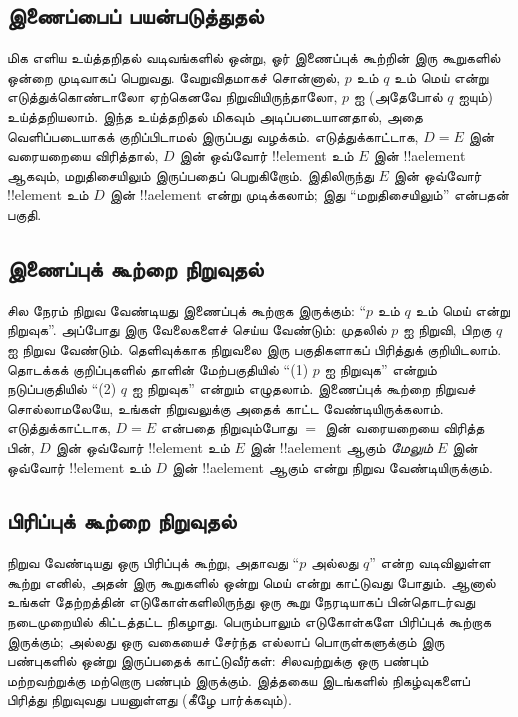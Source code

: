 \documentclass[../../../include/open-logic-section]{subfiles}
\begin{document}
\subsection{இணைப்பைப் பயன்படுத்துதல்}

மிக எளிய உய்த்தறிதல் வடிவங்களில் ஒன்று, ஓர் இணைப்புக்
கூற்றின் இரு கூறுகளில் ஒன்றை முடிவாகப் பெறுவது. வேறுவிதமாகச்
சொன்னால், $p$ உம் $q$ உம் மெய் என்று எடுத்துக்கொண்டாலோ
ஏற்கெனவே நிறுவியிருந்தாலோ, $p$ ஐ (அதேபோல் $q$ ஐயும்)
உய்த்தறியலாம். இந்த உய்த்தறிதல் மிகவும் அடிப்படையானதால்,
அதை வெளிப்படையாகக் குறிப்பிடாமல் இருப்பது வழக்கம்.
எடுத்துக்காட்டாக, $D = E$ இன் வரையறையை விரித்தால்,
$D$ இன் ஒவ்வோர் !!{element} உம் $E$ இன்
!!a{element} ஆகவும், மறுதிசையிலும் இருப்பதைப் பெறுகிறோம்.
இதிலிருந்து $E$ இன் ஒவ்வோர் !!{element} உம் $D$ இன்
!!a{element} என்று முடிக்கலாம்; இது ``மறுதிசையிலும்''
என்பதன் பகுதி.

\subsection{இணைப்புக் கூற்றை நிறுவுதல்}

சில நேரம் நிறுவ வேண்டியது இணைப்புக் கூற்றாக இருக்கும்:
``$p$ உம் $q$ உம் மெய் என்று நிறுவுக''. அப்போது
இரு வேலைகளைச் செய்ய வேண்டும்: முதலில் $p$ ஐ நிறுவி,
பிறகு $q$ ஐ நிறுவ வேண்டும். தெளிவுக்காக நிறுவலை
இரு பகுதிகளாகப் பிரித்துக் குறியிடலாம். தொடக்கக் குறிப்புகளில்
தாளின் மேற்பகுதியில் ``(1) $p$ ஐ நிறுவுக'' என்றும்
நடுப்பகுதியில் ``(2) $q$ ஐ நிறுவுக'' என்றும் எழுதலாம்.
இணைப்புக் கூற்றை நிறுவச் சொல்லாமலேயே, உங்கள் நிறுவலுக்கு
அதைக் காட்ட வேண்டியிருக்கலாம். எடுத்துக்காட்டாக, $D = E$
என்பதை நிறுவும்போது $=$ இன் வரையறையை விரித்த பின்,
$D$ இன் ஒவ்வோர் !!{element} உம் $E$ இன்
!!a{element} ஆகும் \emph{மேலும்} $E$ இன் ஒவ்வோர்
!!{element} உம் $D$ இன் !!a{element} ஆகும்
என்று நிறுவ வேண்டியிருக்கும்.

\subsection{பிரிப்புக் கூற்றை நிறுவுதல்}

நிறுவ வேண்டியது ஒரு பிரிப்புக் கூற்று, அதாவது ``$p$
அல்லது $q$'' என்ற வடிவிலுள்ள கூற்று எனில், அதன்
இரு கூறுகளில் ஒன்று மெய் என்று காட்டுவது போதும்.
ஆனால் உங்கள் தேற்றத்தின் எடுகோள்களிலிருந்து ஒரு கூறு
நேரடியாகப் பின்தொடர்வது நடைமுறையில் கிட்டத்தட்ட நிகழாது.
பெரும்பாலும் எடுகோள்களே பிரிப்புக் கூற்றாக இருக்கும்;
அல்லது ஒரு வகையைச் சேர்ந்த எல்லாப் பொருள்களுக்கும்
இரு பண்புகளில் ஒன்று இருப்பதைக் காட்டுவீர்கள்: சிலவற்றுக்கு
ஒரு பண்பும் மற்றவற்றுக்கு மற்றொரு பண்பும் இருக்கும்.
இத்தகைய இடங்களில் நிகழ்வுகளைப் பிரித்து நிறுவுவது
பயனுள்ளது (கீழே பார்க்கவும்).
\end{document}
